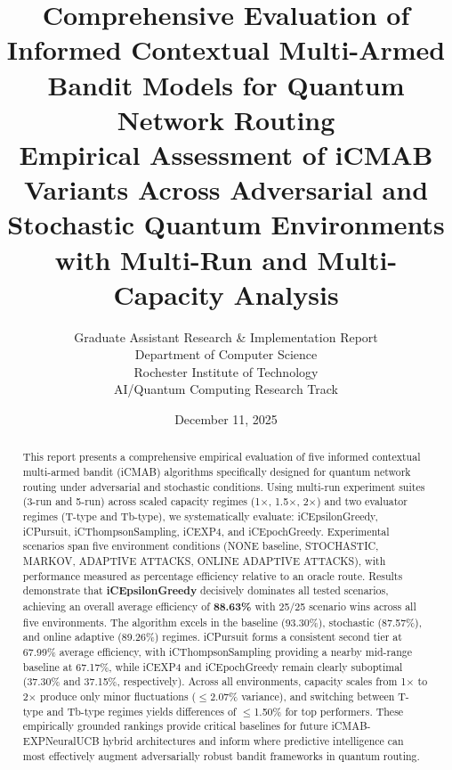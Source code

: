 \documentclass[12pt,a4paper]{article}
\title{\textbf{Comprehensive Evaluation of Informed Contextual Multi-Armed Bandit Models for Quantum Network Routing}\\
\large{Empirical Assessment of iCMAB Variants Across Adversarial and Stochastic Quantum Environments with Multi-Run and Multi-Capacity Analysis}}
\author{Graduate Assistant Research \& Implementation Report\\ 
Department of Computer Science \\ 
Rochester Institute of Technology \\ 
AI/Quantum Computing Research Track}
\date{December 11, 2025}
\newcommand{\performance}[1]{\textcolor{performancecolor}{\textbf{#1}}}
\begin{document}
\maketitle

\begin{abstract}
This report presents a comprehensive empirical evaluation of five informed contextual multi-armed bandit (iCMAB) algorithms specifically designed for quantum network routing under adversarial and stochastic conditions. Using multi-run experiment suites (3-run and 5-run) across scaled capacity regimes (1$\times$, 1.5$\times$, 2$\times$) and two evaluator regimes (T-type and Tb-type), we systematically evaluate: iCEpsilonGreedy, iCPursuit, iCThompsonSampling, iCEXP4, and iCEpochGreedy. Experimental scenarios span five environment conditions (NONE baseline, STOCHASTIC, MARKOV, ADAPTIVE ATTACKS, ONLINE ADAPTIVE ATTACKS), with performance measured as percentage efficiency relative to an oracle route. Results demonstrate that \performance{iCEpsilonGreedy} decisively dominates all tested scenarios, achieving an overall average efficiency of \textbf{88.63\%} with 25/25 scenario wins across all five environments. The algorithm excels in the baseline (93.30\%), stochastic (87.57\%), and online adaptive (89.26\%) regimes. iCPursuit forms a consistent second tier at 67.99\% average efficiency, with iCThompsonSampling providing a nearby mid-range baseline at 67.17\%, while iCEXP4 and iCEpochGreedy remain clearly suboptimal (37.30\% and 37.15\%, respectively). Across all environments, capacity scales from 1$\times$ to 2$\times$ produce only minor fluctuations ($\leq$2.07\% variance), and switching between T-type and Tb-type regimes yields differences of $\leq$1.50\% for top performers. These empirically grounded rankings provide critical baselines for future iCMAB-EXPNeuralUCB hybrid architectures and inform where predictive intelligence can most effectively augment adversarially robust bandit frameworks in quantum routing.
\end{abstract}

\newpage
{\tableofcontents}

\newpage
\end{document}
